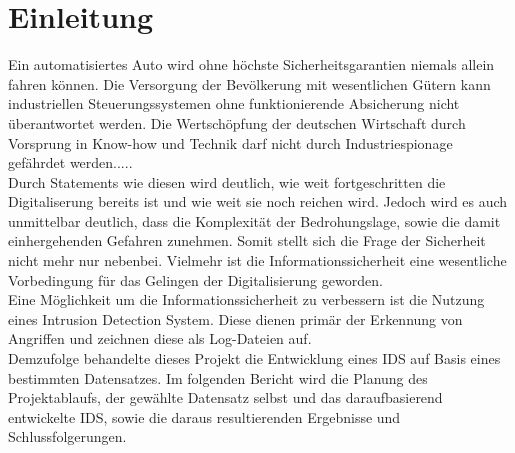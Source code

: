 \documentclass[main.tex]{subfiles}
\begin{document}
\section{Einleitung}
Ein automatisiertes Auto wird ohne höchste Sicherheitsgarantien niemals allein fahren können. Die Versorgung der Bevölkerung mit wesentlichen Gütern kann industriellen Steuerungssystemen ohne funktionierende Absicherung nicht überantwortet werden. Die Wertschöpfung der deutschen Wirtschaft durch Vorsprung in Know-how und Technik darf nicht durch Industriespionage gefährdet werden..... \\
Durch Statements wie diesen wird deutlich, wie weit fortgeschritten die Digitaliserung bereits ist und wie weit sie noch reichen wird. Jedoch wird es auch unmittelbar deutlich, dass die Komplexität der Bedrohungslage, sowie die damit einhergehenden Gefahren zunehmen. Somit stellt sich die Frage der Sicherheit nicht mehr nur nebenbei. Vielmehr ist die Informationssicherheit eine wesentliche Vorbedingung für das Gelingen der Digitalisierung geworden.
\\ 
Eine Möglichkeit um die Informationssicherheit zu verbessern ist die Nutzung eines Intrusion Detection System. Diese dienen primär der Erkennung von Angriffen und zeichnen diese als Log-Dateien auf.
\\
Demzufolge behandelte dieses Projekt die Entwicklung eines IDS auf Basis eines bestimmten Datensatzes. Im folgenden Bericht wird die Planung des Projektablaufs, der gewählte Datensatz selbst und das daraufbasierend entwickelte IDS, sowie die daraus resultierenden Ergebnisse und Schlussfolgerungen.
\\
\end{document}
